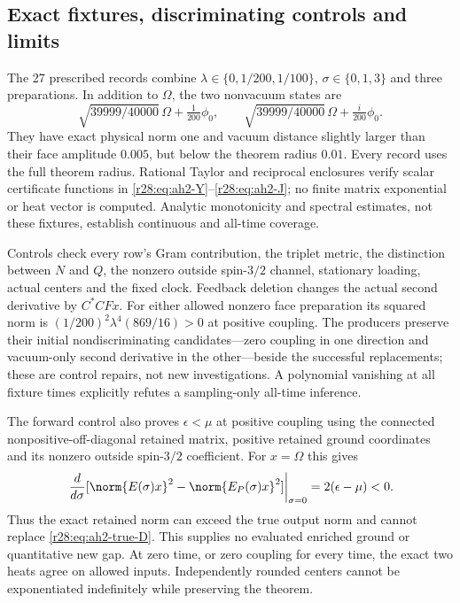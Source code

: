 \subsection{Exact fixtures, discriminating controls and limits}
The 27 prescribed records combine $\lambda\in\{0,1/200,1/100\}$, $\sigma\in\{0,1,3\}$ and three preparations. In addition to $\Omega$, the two nonvacuum states are
\begin{equation}
 \sqrt{39999/40000}\,\Omega+\tfrac1{200}\phi_0,
 \qquad
 \sqrt{39999/40000}\,\Omega+\tfrac{i}{200}\phi_0.
\end{equation}
They have exact physical norm one and vacuum distance slightly larger than their face amplitude $0.005$, but below the theorem radius $0.01$. Every record uses the full theorem radius. Rational Taylor and reciprocal enclosures verify scalar certificate functions in \eqref{r28:eq:ah2-Y}--\eqref{r28:eq:ah2-J}; no finite matrix exponential or heat vector is computed. Analytic monotonicity and spectral estimates, not these fixtures, establish continuous and all-time coverage.

Controls check every row's Gram contribution, the triplet metric, the distinction between $N$ and $Q$, the nonzero outside spin-$3/2$ channel, stationary loading, actual centers and the fixed clock. Feedback deletion changes the actual second derivative by $C^*CFx$. For either allowed nonzero face preparation its squared norm is $(1/200)^2\lambda^4(869/16)>0$ at positive coupling. The producers preserve their initial nondiscriminating candidates---zero coupling in one direction and vacuum-only second derivative in the other---beside the successful replacements; these are control repairs, not new investigations. A polynomial vanishing at all fixture times explicitly refutes a sampling-only all-time inference.

The forward control also proves $\epsilon<\mu$ at positive coupling using the connected nonpositive-off-diagonal retained matrix, positive retained ground coordinates and its nonzero outside spin-$3/2$ coefficient. For $x=\Omega$ this gives
\begin{equation}
 \left.\frac d{d\sigma}
 [\norm{E(\sigma)x}^2-\norm{E_P(\sigma)x}^2]\right|_{\sigma=0}
 =2(\epsilon-\mu)<0.
\end{equation}
Thus the exact retained norm can exceed the true output norm and cannot replace \eqref{r28:eq:ah2-true-D}. This supplies no evaluated enriched ground or quantitative new gap. At zero time, or zero coupling for every time, the exact two heats agree on allowed inputs. Independently rounded centers cannot be exponentiated indefinitely while preserving the theorem.

